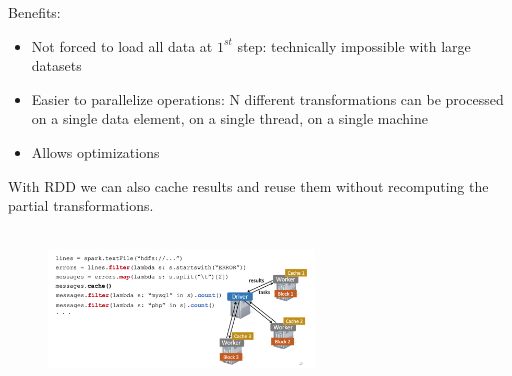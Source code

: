 \documentclass[10pt,a4paper]{article}
\newcommand{\nline}{\\~\\}
\begin{document}
 Benefits:
 \begin{itemize}
 	\item Not forced to load all data at $1^{st}$ step: technically impossible with large datasets
 	\item Easier to parallelize operations: N different transformations can be processed on a single data element, on a single thread, on a single machine
 	\item Allows optimizations
 \end{itemize}
With RDD we can also cache results and reuse them without recomputing the partial transformations.
 \nline
\begin{figure}[ht!]
 \hfill \includegraphics[width=200pt]{images/spark-caching}
 \hspace*{\fill}
 \end{figure} 
\end{document}
